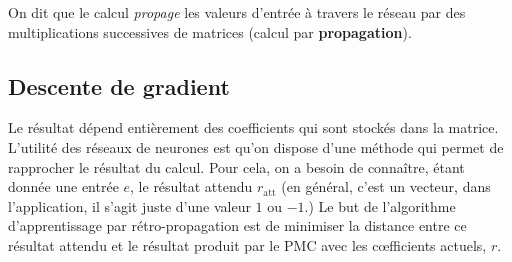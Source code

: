\documentclass[a4paper]{article}
\begin{document}
On dit que le calcul \emph{propage} les valeurs d'entrée à travers le
réseau par des multiplications successives de matrices (calcul par
\textbf{propagation}).

\subsection{Descente de gradient}

Le résultat dépend entièrement des coefficients qui sont stockés dans
la matrice. L'utilité des réseaux de neurones est qu'on dispose d'une
méthode qui permet de rapprocher le résultat du calcul. Pour cela, on
a besoin de connaître, étant donnée une entrée \(e\), le résultat
attendu \(r_{\text{att}}\) (en général, c'est un vecteur, dans
l'application, il s'agit juste d'une valeur \(1\) ou \(-1\).)  Le but
de l'algorithme d'apprentissage par rétro-propagation est de minimiser
la distance entre ce résultat attendu et le résultat produit par le
PMC avec les c\oe fficients actuels, \(r\).
\end{document}
